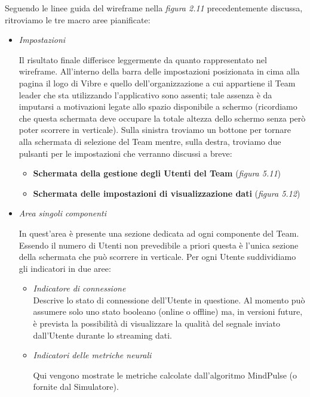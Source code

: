 \vspace{5mm}
\noindent Seguendo le linee guida del wireframe nella \emph{figura 2.11} precedentemente discussa, ritroviamo le tre macro aree pianificate:
\begin{itemize}
    \item \emph{Impostazioni}\\
    {Il risultato finale differisce leggermente da quanto rappresentato nel wireframe.\newline
    All'interno della barra delle impostazioni posizionata in cima alla pagina il logo di Vibre e quello dell'organizzazione a cui appartiene il Team leader che sta utilizzando l'applicativo sono assenti; tale assenza è da imputarsi a motivazioni legate allo spazio disponibile a schermo (ricordiamo che questa schermata deve occupare la totale altezza dello schermo senza però poter scorrere in verticale).\newline
    Sulla sinistra troviamo un bottone per tornare alla schermata di selezione del Team mentre, sulla destra, troviamo due pulsanti per le impostazioni che verranno discussi a breve:\newline
    \begin{itemize}
        \item {\bf Schermata della gestione degli Utenti del Team} (\emph{figura 5.11})
        \item {\bf Schermata delle impostazioni di visualizzazione dati} (\emph{figura 5.12})
    \end{itemize}}
    \item \emph{Area singoli componenti}\\
    {In quest'area è presente una sezione dedicata ad ogni componente del Team.\newline
    Essendo il numero di Utenti non prevedibile a priori questa è l'unica sezione della schermata che può scorrere in verticale.\newline
    Per ogni Utente suddividiamo gli indicatori in due aree:\newline
    \begin{itemize}
        \item \emph{Indicatore di connessione}\\
        {Descrive lo stato di connessione dell'Utente in questione.\newline
        Al momento può assumere solo uno stato booleano (online o offline) ma, in versioni future, è prevista la possibilità di visualizzare la qualità del segnale inviato dall'Utente durante lo streaming dati.}
        \item \emph{Indicatori delle metriche neurali}\\
        {Qui vengono mostrate le metriche calcolate dall'algoritmo MindPulse (o fornite dal Simulatore).\newline
        
}
\end{itemize}}
\end{itemize}
